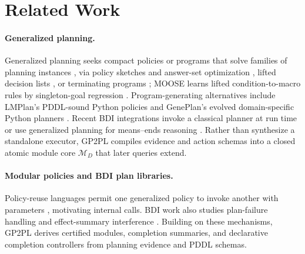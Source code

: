 \section{Related Work}
\label{sec:related-work}

\paragraph{Generalized planning.}
Generalized planning seeks compact policies or programs that solve families of
planning instances
\cite{Jimenez2019ReviewGeneralizedPlanning,Srivastava2011DirectedSearch,
Bonet2018Features,Frances2021LearningGeneralPolicies,
Bonet2024GeneralPoliciesWidth}, via policy sketches and answer-set optimization
\cite{Drexler2022LearningSketches,Drexler2024SubgoalSketches}, lifted decision
lists \cite{Yang2022PG3}, or terminating programs
\cite{SegoviaAguas2022BFGPpp}; MOOSE learns lifted condition-to-macro rules by
singleton-goal regression \cite{Chen2026Moose}. Program-generating alternatives
include LMPlan's PDDL-sound Python policies \cite{Chen2025LMPlan} and GenePlan's
evolved domain-specific Python planners \cite{Murray2026GenePlan}. Recent BDI
integrations invoke a classical planner at run time
\cite{Xu2024OperationalSemantics} or use generalized planning for means--ends
reasoning \cite{Meneguzzi2025GeneralisedBDIPlanning}. Rather than synthesize a
standalone executor, GP2PL compiles evidence and action schemas into a closed
atomic module core $\mathcal M_D$ that later queries extend.

\paragraph{Modular policies and BDI plan libraries.}
Policy-reuse languages permit one generalized policy to invoke another with
parameters \cite{Bonet2024PolicyReuse}, motivating internal calls. BDI work also
studies plan-failure handling
\cite{Sardina2007PlanFailure} and effect-summary interference
\cite{Thangarajah2003GoalInterference}. Building on these mechanisms, GP2PL
derives certified modules, completion summaries, and declarative completion
controllers from planning evidence and PDDL schemas.

